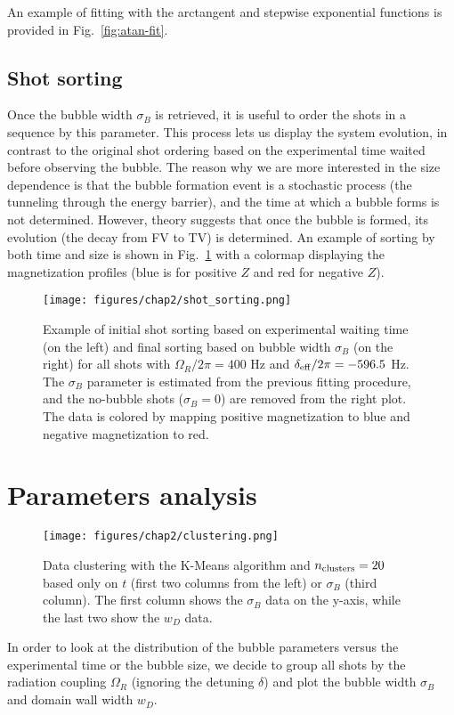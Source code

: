 An example of fitting with the arctangent and stepwise exponential functions is provided in Fig.\ \ref{fig:atan-fit}.

\subsection{Shot sorting}
Once the bubble width $\sigma_B$ is retrieved, it is useful to order the shots in a sequence by this parameter. This process lets us display the system evolution, in contrast to the original shot ordering based on the experimental time waited before observing the bubble. The reason why we are more interested in the size dependence is that the bubble formation event is a stochastic process (the tunneling through the energy barrier), and the time at which a bubble forms is not determined. However, theory suggests that once the bubble is formed, its evolution (the decay from FV to TV) is determined. 
An example of sorting by both time and size is shown in Fig.\ \ref{fig:sorting} with a colormap displaying the magnetization profiles (blue is for positive $Z$ and red for negative $Z$).

\begin{figure}[ht!]
    \centering
    \texttt{[image: figures/chap2/shot\_sorting.png]}
    \caption{Example of initial shot sorting based on experimental waiting time (on the left) and final sorting based on bubble width $\sigma_B$ (on the right) for all shots with $\Omega_R/2\pi = 400$ \unit{\hertz} and $\delta_{\rm eff}/2\pi = -596.5$ \unit{\hertz}. The $\sigma_B$ parameter is estimated from the previous fitting procedure, and the no-bubble shots ($\sigma_B = 0$) are removed from the right plot. The data is colored by mapping positive magnetization to blue and negative magnetization to red.}
    \label{fig:sorting}
\end{figure}

\section{Parameters analysis}
\label{sec:params}
\begin{figure}[ht!]
    \centering
    \texttt{[image: figures/chap2/clustering.png]}
    \caption{Data clustering with the K-Means algorithm and $n_{\rm clusters} = 20$ based only on $t$ (first two columns from the left) or $\sigma_B$ (third column). The first column shows the $\sigma_B$ data on the y-axis, while the last two show the $w_D$ data.}
    \label{fig:clust}
\end{figure} 
In order to look at the distribution of the bubble parameters versus the experimental time or the bubble size, we decide to group all shots by the radiation coupling $\Omega_R$ (ignoring the detuning $\delta$) and plot the bubble width $\sigma_B$ and domain wall width $w_D$. 

